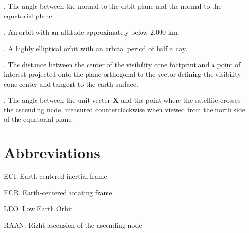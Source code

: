 \documentclass[oneside,12pt]{report}
\begin{document}
\vspace{8pt}
.  The angle between the normal to the orbit plane
and the normal to the equatorial plane.

\vspace{8pt} . An orbit with an altitude approximately below 2,000 km.

\vspace{8pt} . A highly elliptical orbit with an orbital period of half a day.

\vspace{8pt} . The distance between the center of the visibility cone footprint and a point of interest projected onto the plane orthogonal to the vector defining the visibility cone center and tangent to the earth surface.

\vspace{8pt}
. The angle
between the unit vector $\bm{X}$ and the point where the satellite crosses the
ascending node, measured counterclockwise when viewed from the north side of
the equatorial plane.


\chapter{Abbreviations}\label{Abbreviations}


\noindent ECI.  Earth-centered inertial frame

\vspace{5pt}

\noindent ECR.  Earth-centered rotating frame

\vspace{5pt}

\noindent LEO.  Low Earth Orbit  

\vspace{5pt}

\noindent RAAN. Right ascension of the ascending node

\vspace{5pt}




\renewcommand\bibname{Selected Bibliography Including Cited Works}
\nocite{*}  %

\end{document}
